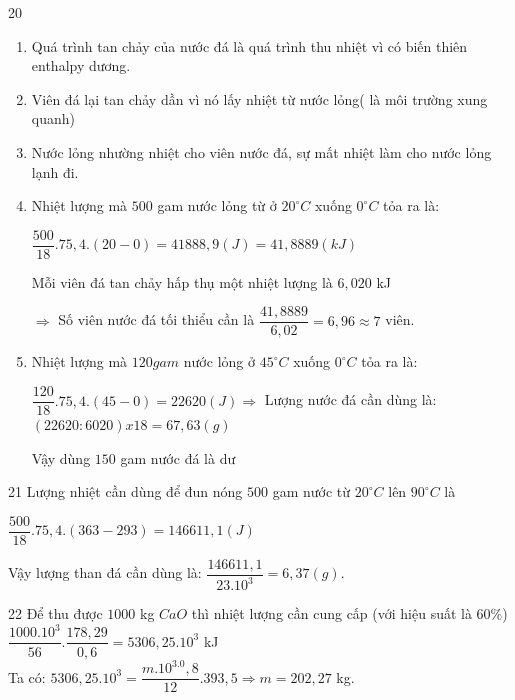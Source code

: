 \def\writeANS{}
\begin{loigiaibth}{20}
  \begin {enumerate} \item [(a)] Quá trình tan chảy của nước đá là quá trình thu nhiệt vì có biến thiên enthalpy dương. \item [(b)] Viên đá lại tan chảy dần vì nó lấy nhiệt từ nước lỏng( là môi trường xung quanh) \item [(c)] Nước lỏng nhường nhiệt cho viên nước đá, sự mất nhiệt làm cho nước lỏng lạnh đi. \item [(d)] Nhiệt lượng mà $500$ gam nước lỏng từ ở $20^\circ C$ xuống $0^\circ C$ tỏa ra là: \par $\dfrac {500}{18}.75{,}4.(20-0) = 41888{,}9 (J) = 41{,}8889 (kJ)$ \par Mỗi viên đá tan chảy hấp thụ một nhiệt lượng là $6{,}020$ kJ \par $\Rightarrow $ Số viên nước đá tối thiểu cần là $\dfrac {41{,}8889}{6{,}02} = 6{,}96 \approx 7$ viên. \item [(e)] Nhiệt lượng mà $120gam$ nước lỏng ở $45^\circ C$ xuống $0^\circ C$ tỏa ra là: \par $\dfrac {120}{18}.75{,}4.(45-0) = 22620 (J) \Rightarrow $ Lượng nước đá cần dùng là: $(22620 : 6020) x 18 = 67{,}63 (g)$ \par Vậy dùng $150$ gam nước đá là dư \end {enumerate}
\end{loigiaibth}
\def\writeANS{}
\begin{loigiaibth}{21}
  Lượng nhiệt cần dùng để đun nóng $500$ gam nước từ $20^\circ C$ lên $90^\circ C$ là \par $\dfrac {500}{18}.75{,}4.(363-293) = 146611{,}1(J)$ \par Vậy lượng than đá cần dùng là: $\dfrac {146611{,}1}{23.10^3} = 6{,}37 (g)$.
\end{loigiaibth}
\def\writeANS{}
\begin{loigiaibth}{22}
  Để thu được $1000$ kg $CaO$ thì nhiệt lượng cần cung cấp (với hiệu suất là $60\%$) \\ $\dfrac {1000.10^3}{56}.\dfrac {178{,}29}{0{,}6} = 5306{,}25.10^3$ kJ \\ Ta có: $5306{,}25.10^3 = \dfrac {m.10^3.0{,}8}{12}.393{,}5 \Rightarrow m = 202{,}27$ kg.
\end{loigiaibth}
\def\writeANS{}
